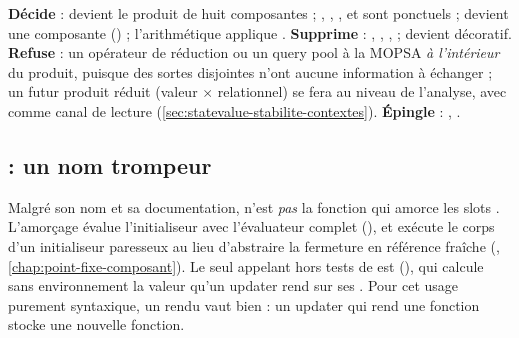 \begin{decision}
\textbf{Décide} :  devient le produit de huit composantes ;
, , ,  et
 sont ponctuels ;  devient une
composante () ; l'arithmétique applique
. \textbf{Supprime} : ,
, ,  ;
 devient décoratif. \textbf{Refuse} : un opérateur de
réduction ou un \og query pool\fg{} à la MOPSA \emph{à l'intérieur} du
produit, puisque des sortes disjointes n'ont aucune information à
échanger ; un futur produit réduit (valeur $\times$ relationnel) se fera au
niveau de l'analyse, avec  comme canal de lecture
(\cref{sec:statevalue-stabilite-contextes}). \textbf{Épingle} :
,
.
\end{decision}

\subsection{ : un nom trompeur}


\begin{piege}
  Malgré son nom et sa documentation,  n'est \emph{pas} la
  fonction qui amorce les slots . L'amorçage évalue
  l'initialiseur avec l'évaluateur complet (), et
  exécute le corps d'un initialiseur paresseux 
  au lieu d'abstraire la fermeture en référence fraîche
  (, \cref{chap:point-fixe-composant}).
  Le seul appelant hors tests de  est
   (), qui calcule
  sans environnement la valeur qu'un updater  rend
  sur ses . Pour cet usage purement syntaxique, un
   rendu vaut bien  : un updater qui rend une
  fonction stocke une nouvelle fonction.
\end{piege}

